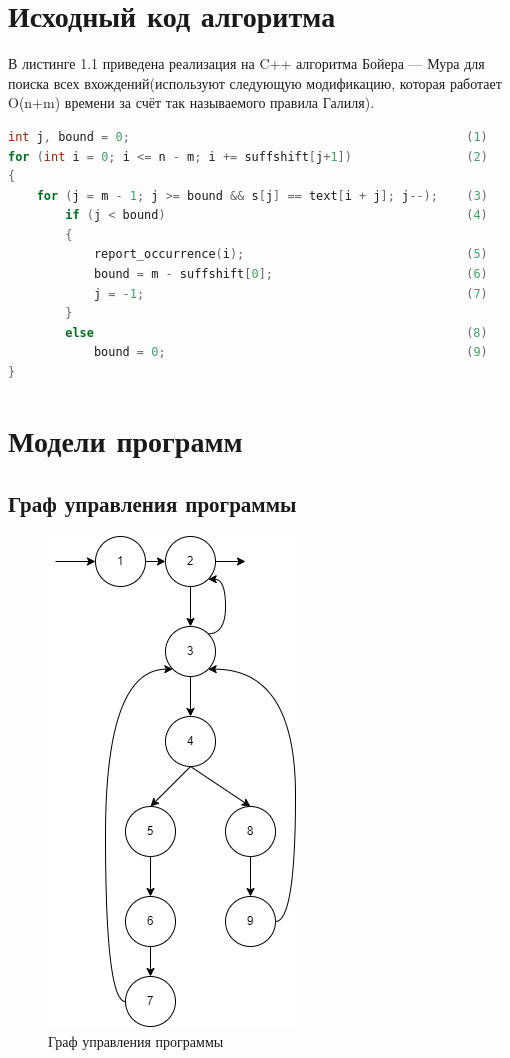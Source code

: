 \documentclass[12pt]{report}
\begin{document}
\tableofcontents

\newpage
\chapter{Исходный код алгоритма}

В листинге 1.1 приведена реализация на C++ алгоритма Бойера — Мура для поиска всех вхождений(используют следующую модификацию, которая работает O(n+m) времени за счёт так называемого правила Галиля).
\begin{lstlisting}[label=some-code,caption=алгоритм Бойера — Мура для поиска всех вхождений, language=C]
int j, bound = 0;                                               (1)
for (int i = 0; i <= n - m; i += suffshift[j+1])                (2)
{
    for (j = m - 1; j >= bound && s[j] == text[i + j]; j--);    (3)
        if (j < bound)                                          (4)
        {
            report_occurrence(i);                               (5)
            bound = m - suffshift[0];                           (6)
            j = -1;                                             (7)
        }
        else                                                    (8)
            bound = 0;                                          (9)
}

\end{lstlisting}

\chapter{Модели программ}

\section{Граф управления программы}

\begin{figure}[hp!]
	\centering
	\includegraphics[scale=0.9]{report_files/control_graph.jpg}
	\caption{Граф управления программы}
	\label{fig:mpr}
\end{figure}
\newpage
\end{document}

